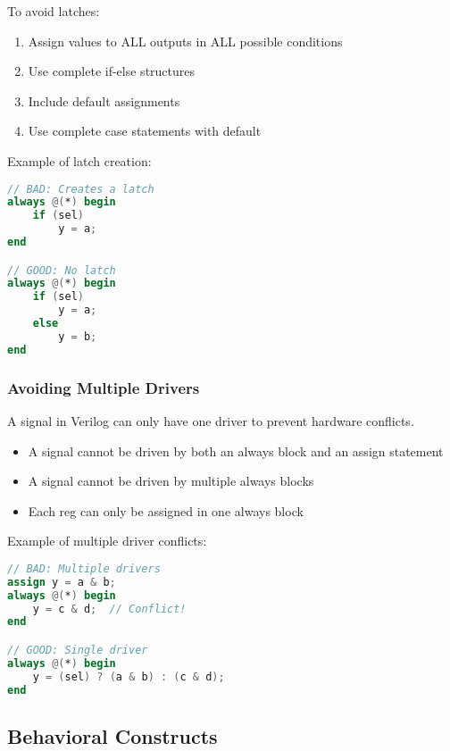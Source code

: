 \documentclass[12pt]{betterjournal}
\begin{document}
\begin{important}[frametitle={Latch Prevention}]
To avoid latches:
\begin{enumerate}
    \item Assign values to ALL outputs in ALL possible conditions
    \item Use complete if-else structures
    \item Include default assignments
    \item Use complete case statements with default
\end{enumerate}
\end{important}

Example of latch creation:
\begin{lstlisting}[language=verilog]
// BAD: Creates a latch
always @(*) begin
    if (sel) 
        y = a;
end

// GOOD: No latch
always @(*) begin
    if (sel)
        y = a;
    else
        y = b;
end
\end{lstlisting}

\subsubsection{Avoiding Multiple Drivers}

A signal in Verilog can only have one driver to prevent hardware conflicts.

\begin{important}[frametitle={Multiple Driver Rules}]
\begin{itemize}
    \item A signal cannot be driven by both an always block and an assign statement
    \item A signal cannot be driven by multiple always blocks
    \item Each reg can only be assigned in one always block
\end{itemize}
\end{important}

Example of multiple driver conflicts:
\begin{lstlisting}[language=verilog]
// BAD: Multiple drivers
assign y = a & b;
always @(*) begin
    y = c & d;  // Conflict!
end

// GOOD: Single driver
always @(*) begin
    y = (sel) ? (a & b) : (c & d);
end
\end{lstlisting}

\subsection{Behavioral Constructs}
\end{document}

